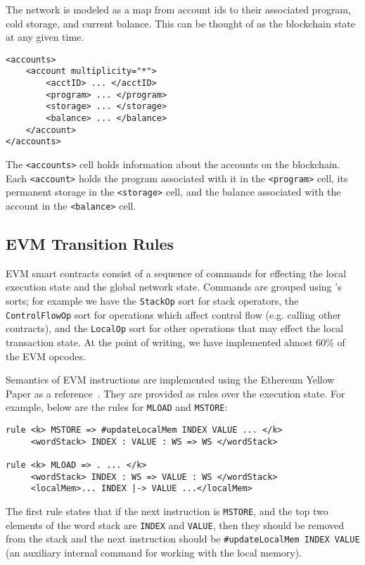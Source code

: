 The network is modeled as a map from account ids to their associated program,
cold storage, and current balance. This can be thought of as the blockchain
state at any given time.

\begin{verbatim}
<accounts>
    <account multiplicity="*">
        <acctID> ... </acctID>
        <program> ... </program>
        <storage> ... </storage>
        <balance> ... </balance>
    </account>
</accounts>
\end{verbatim}

The \texttt{<accounts>} cell holds information about the accounts on the blockchain. Each \texttt{<account>} holds the program associated with it in the
\texttt{<program>} cell, its permanent storage in the \texttt{<storage>} cell,
and the balance associated with the account in the \texttt{<balance>} cell.

\subsection{EVM Transition Rules}

EVM smart contracts consist of a sequence of commands for effecting the local
execution state and the global network state. Commands are grouped using \K{}'s
sorts; for example we have the \texttt{StackOp} sort for stack operators, the
\texttt{ControlFlowOp} sort for operations which affect control flow (e.g.
calling other contracts), and the \texttt{LocalOp} sort for other operations
that may effect the local transaction state. At the point of writing, we have
implemented almost 60\% of the EVM opcodes.

Semantics of EVM instructions are implemented using the Ethereum Yellow Paper as a
reference~\cite{wood2014ethereum}. They are provided as \K{} rules over the
execution state. For example, below are the rules for \texttt{MLOAD} and
\texttt{MSTORE}:

\begin{verbatim}
rule <k> MSTORE => #updateLocalMem INDEX VALUE ... </k>
     <wordStack> INDEX : VALUE : WS => WS </wordStack>

rule <k> MLOAD => . ... </k>
     <wordStack> INDEX : WS => VALUE : WS </wordStack>
     <localMem>... INDEX |-> VALUE ...</localMem>
\end{verbatim}

The first rule states that if the next instruction is \texttt{MSTORE}, and the
top two elements of the word stack are \texttt{INDEX} and \texttt{VALUE}, then
they should be removed from the stack and the next instruction should be
\texttt{\#updateLocalMem INDEX VALUE} (an auxiliary internal command for working
with the local memory).

